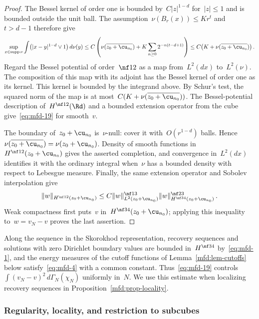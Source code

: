 \documentclass[11pt]{amsart}
\begin{document}
\begin{proof}
The Bessel kernel of order one is bounded by~$C|z|^{1-d}$ for~$|z|\leq1$ and is bounded outside the unit ball. The assumption~$\nu(B_r(x))\leq Kr^t$ and~$t>d-1$ therefore give
\begin{equation*}
	\sup_{x\in\operatorname{supp}\nu}\int\bigl(|x-y|^{1-d}\vee1\bigr)\,d\nu(y)
	\leq C\left(\nu(\overline{z_0+\cu_{n_0}})+K\sum_{n\geq0}2^{-n(t-d+1)}\right)
	\leq C\bigl(K+\nu(\overline{z_0+\cu_{n_0}})\bigr)\,.
\end{equation*}
Regard the Bessel potential of order~$\nf12$ as a map from~$L^2(dx)$ to~$L^2(\nu)$. The composition of this map with its adjoint has the Bessel kernel of order one as its kernel. This kernel is bounded by the integrand above. By Schur's test, the squared norm of the map is at most~$C(K+\nu(\overline{z_0+\cu_{n_0}}))$. The Bessel-potential description of~$H^{\nf12}(\Rd)$ and a bounded extension operator from the cube give~\eqref{eq:mfd-19} for smooth~$v$.

\smallskip

The boundary of~$z_0+\cu_{n_0}$ is~$\nu$-null: cover it with~$O(r^{1-d})$ balls. Hence~$\nu(\overline{z_0+\cu_{n_0}})=\nu(z_0+\cu_{n_0})$. Density of smooth functions in~$H^{\nf12}(z_0+\cu_{n_0})$ gives the asserted completion, and convergence in~$L^2(dx)$ identifies it with the ordinary integral when~$\nu$ has a bounded density with respect to Lebesgue measure. Finally, the same extension operator and Sobolev interpolation give
\begin{equation*}
	\|w\|_{H^{\nf12}(z_0+\cu_{n_0})}
	\leq C\|w\|_{L^2(z_0+\cu_{n_0})}^{\nf13}\|w\|_{H^{\nf34}(z_0+\cu_{n_0})}^{\nf23}\,.
\end{equation*}
Weak compactness first puts~$v$ in~$H^{\nf34}(z_0+\cu_{n_0})$; applying this inequality to~$w=v_N-v$ proves the last assertion.
\end{proof}

Along the sequence in the Skorokhod representation, recovery sequences and solutions with zero Dirichlet boundary values are bounded in~$H^{\nf34}$ by~\eqref{eq:mfd-1}, and the energy measures of the cutoff functions of Lemma~\ref{mfd:lem-cutoffs} below satisfy~\eqref{eq:mfd-4} with a common constant. Thus~\eqref{eq:mfd-19} controls~$\int(v_N-v)^2\,d\Gamma_N(\chi_N)$ uniformly in~$N$. We use this estimate when localizing recovery sequences in Proposition~\ref{mfd:prop-locality}.

\subsubsection{Regularity, locality, and restriction to subcubes}
\end{document}
